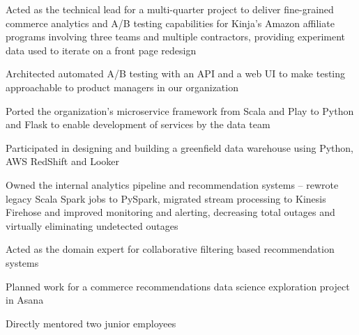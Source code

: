 \begin{job}

  \begin{accomplishments}
    \item Acted as the technical lead for a multi-quarter project to deliver
    fine-grained commerce analytics and A/B testing capabilities for Kinja's
    Amazon affiliate programs involving three teams and multiple contractors,
    providing experiment data used to iterate on a front page redesign
    \item Architected automated A/B testing with an API and a web UI to make
    testing approachable to product managers in our organization
    \item Ported the organization's microservice framework from Scala and Play
    to Python and Flask to enable development of services by the data team
    \item Participated in designing and building a greenfield data warehouse
    using Python, AWS RedShift and Looker
    \item Owned the internal analytics pipeline and recommendation systems --
    rewrote legacy Scala Spark jobs to PySpark, migrated stream processing to
    Kinesis Firehose and improved monitoring and alerting, decreasing total
    outages and virtually eliminating undetected outages
    \item Acted as the domain expert for collaborative filtering based
    recommendation systems
    \item Planned work for a commerce recommendations data science exploration
    project in Asana
    \item Directly mentored two junior employees
  \end{accomplishments}
\end{job}
